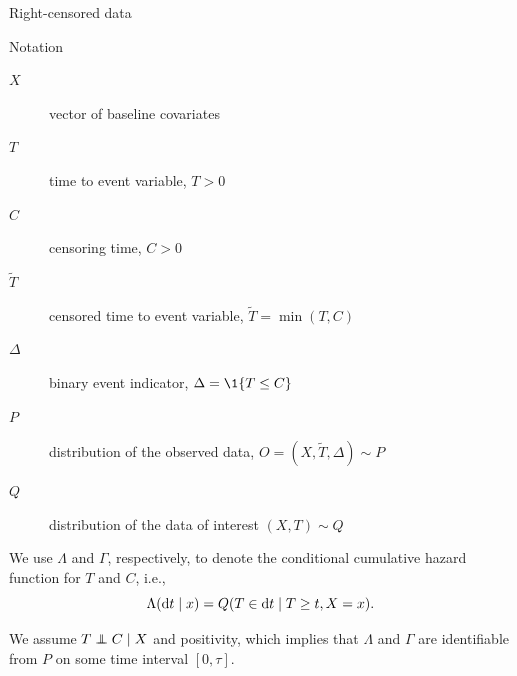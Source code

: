 \documentclass[smaller]{beamer}\usepackage{listings}
\begin{document}
\begin{frame}[label={sec:org44e2829}]{Right-censored data}
\small

\begin{block}{Notation}
\begin{description}
\item[{\(X\)}] vector of baseline covariates
\item[{\(T\)}] time to event variable, \(T > 0\)
\item[{\(C\)}] censoring time, \(C > 0\)
\item[{\color{gray}\(\tilde T\)\color{black}}] censored time to event variable, \(\tilde T = \min(T, C)\)
\item[{\color{gray}\(\Delta\)\color{black}}] binary event indicator, \(\Delta =
  \1{\{T \leq C\}}\)
\item[{\color{gray}\(P\)\color{black}}] distribution of the observed data, \(O =
  (X, \tilde T, \Delta) \sim P\)
\item[{\(Q\)}] distribution of the data of interest \((X, T) \sim Q\)
\end{description}

\hfill

We use \color{bblue} \(\Lambda\) \color{black} and
\color{bblue}\(\Gamma\)\color{black}, respectively, to denote the conditional
cumulative hazard function for \(T\) and \(C\), i.e.,
\begin{equation*}
  \Lambda(\mathop{}\!\mathrm{d} t \mid x) = Q(T \in \mathop{}\!\mathrm{d} t \mid T \geq t, X=x).
\end{equation*}

We assume \(T \independent C \mid X\) and positivity, which implies that
\(\Lambda\) and \(\Gamma\) are identifiable from \(P\) on some time interval \([0,\tau]\).
\end{block}
\end{frame}
\end{document}
